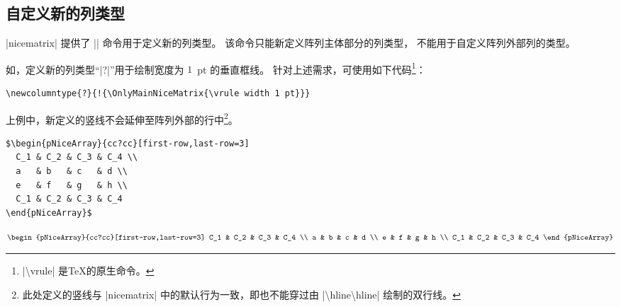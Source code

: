 \documentclass[dvipsnames]{article}%
\begin{document}
\subsection{自定义新的列类型}

\label{OnlyMainNiceMatrix}

|nicematrix| 提供了 |\OnlyMainNiceMatrix| 命令用于定义新的列类型。
该命令只能新定义阵列主体部分的列类型，
不能用于自定义阵列外部列的类型。
 
如，定义新的列类型“|?|”用于绘制宽度为 $1$~pt 的垂直框线。
针对上述需求，可使用如下代码\footnote{|\textbackslash vrule| 是\TeX 的原生命令。}：

\begin{Verbatim}
\newcolumntype{?}{!{\OnlyMainNiceMatrix{\vrule width 1 pt}}}
\end{Verbatim}

上例中，新定义的竖线不会延伸至阵列外部的行中\footnote{此处定义的竖线与 |nicematrix| 中的默认行为一致，即也不能穿过由 |\textbackslash hline\textbackslash hline| 绘制的双行线。}。
\medskip
\begin{scope}

\begin{BVerbatim}[baseline = c, boxwidth = 10.5cm]
$\begin{pNiceArray}{cc?cc}[first-row,last-row=3]
  C_1 & C_2 & C_3 & C_4 \\
  a   & b   & c   & d \\
  e   & f   & g   & h \\
  C_1 & C_2 & C_3 & C_4
\end{pNiceArray}$
\end{BVerbatim}
$\begin{pNiceArray}{cc?cc}[first-row,last-row=3]
C_1 & C_2 & C_3 & C_4 \\
a & b & c & d \\
e & f & g & h \\
C_1 & C_2 & C_3 & C_4
\end{pNiceArray}$
\end{scope}
\end{document}
